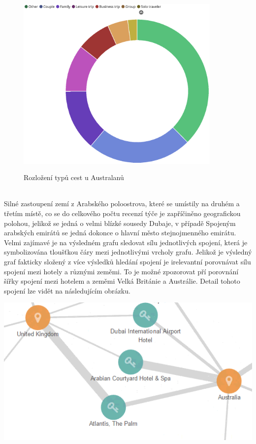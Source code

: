 \documentclass[czech,BP]{thesiskiv}
\begin{document}
\begin{figure} [h]
	\centering
	\includegraphics[width=10cm]{img/australia.eps}
	\label{Rozložení typů cest u Australanů}
	\caption{Rozložení typů cest u Australanů}
\end{figure}
\\
Silné zastoupení zemí z Arabského poloostrova, které se umístily na druhém a třetím místě, co se do celkového počtu recenzí týče je zapříčiněno geografickou polohou, jelikož se jedná o velmi blízké sousedy Dubaje, v případě Spojeným arabských emirátů se jedná dokonce o hlavní město stejnojmenného emirátu.
Velmi zajímavé je na výsledném grafu sledovat sílu jednotlivých spojení, která je symbolizována tloušťkou čáry mezi jednotlivými vrcholy grafu. Jelikož je výsledný graf fakticky složený z více výsledků hledání spojení je irelevantní porovnávat sílu spojení mezi hotely a různými zeměmi. To je možné zpozorovat pří porovnání šířky spojení mezi hotelem  a zeměmi Velká Británie a Austrálie. Detail tohoto spojení lze vidět na následujícím obrázku.
\begin{center}
	\includegraphics[width=\textwidth]{img/detail_spojeni.PNG}
\end{center}
\end{document}
